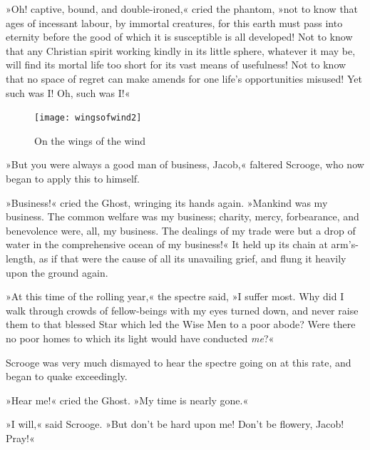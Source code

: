 »Oh! captive, bound, and double-ironed,« cried the phantom, »not to know that ages of incessant labour, by immortal creatures, for this earth must pass into eternity before the good of which it is susceptible is all developed! Not to know that any Christian spirit working kindly in its little sphere, whatever it may be, will find its mortal life too short for its vast means of usefulness! Not to know that no space of regret can make amends for one life's opportunities misused! Yet such was I! Oh, such was I!«

\makeatletter
{}
{%
	\begin{figure}[b!]
		\centering
		\texttt{[image: wingsofwind2]}
		\caption{On the wings of the wind}
	\end{figure}
}{%
}
\makeatother



»But you were always a good man of business, Jacob,« faltered Scrooge, who now began to apply this to himself.

»Business!« cried the Ghost, wringing its hands again. »Mankind was my business. The common welfare was my business; charity, mercy, forbearance, and benevolence were, all, my business. The dealings of my trade were but a drop of water in the comprehensive ocean of my business!«
It held up its chain at arm's-length, as if that were the cause of all its unavailing grief, and flung it heavily upon the ground again.




»At this time of the rolling year,« the spectre said, »I suffer most. Why did I walk through crowds of fellow-beings with my eyes turned down, and never raise them to that blessed Star which led the Wise Men to a poor abode? Were there no poor homes to which its light would have conducted \textit{me}?«



Scrooge was very much dismayed to hear the spectre going on at this rate, and began to quake exceedingly.

»Hear me!« cried the Ghost. »My time is nearly gone.«

»I will,« said Scrooge. »But don't be hard upon me! Don't be flowery, Jacob! Pray!«




